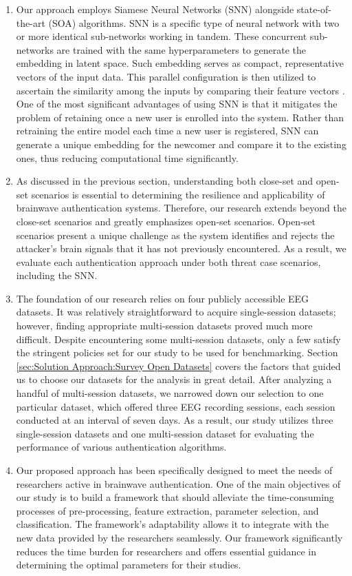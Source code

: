 \begin{enumerate}
\item Our approach employs Siamese Neural Networks (SNN) alongside state-of-the-art (SOA) algorithms. SNN is a specific type of neural network with two or more identical sub-networks working in tandem. These concurrent sub-networks are trained with the same hyperparameters to generate the embedding in latent space. Such embedding serves as compact, representative vectors of the input data. This parallel configuration is then utilized to ascertain the similarity among the inputs by comparing their feature vectors \cite{fallahi2023brainnet}. One of the most significant advantages of using SNN is that it mitigates the problem of retaining once a new user is enrolled into the system. Rather than retraining the entire model each time a new user is registered, SNN can generate a unique embedding for the newcomer and compare it to the existing ones, thus reducing computational time significantly.

\item As discussed in the previous section, understanding both close-set and open-set scenarios is essential to determining the resilience and applicability of brainwave authentication systems. Therefore, our research extends beyond the close-set scenarios and greatly emphasizes open-set scenarios. Open-set scenarios present a unique challenge as the system identifies and rejects the attacker's brain signals that it has not previously encountered. As a result, we evaluate each authentication approach under both threat case scenarios, including the SNN.

\item The foundation of our research relies on four publicly accessible EEG datasets. It was relatively straightforward to acquire single-session datasets; however, finding appropriate multi-session datasets proved much more difficult. Despite encountering some multi-session datasets, only a few satisfy the stringent policies set for our study to be used for benchmarking. Section \ref{sec:Solution Approach:Survey Open Datasets} covers the factors that guided us to choose our datasets for the analysis in great detail. After analyzing a handful of multi-session datasets, we narrowed down our selection to one particular dataset, which offered three EEG recording sessions, each session conducted at an interval of seven days. As a result, our study utilizes three single-session datasets and one multi-session dataset for evaluating the performance of various authentication algorithms.

\item Our proposed approach has been specifically designed to meet the needs of researchers active in brainwave authentication. One of the main objectives of our study is to build a framework that should alleviate the time-consuming processes of pre-processing, feature extraction, parameter selection, and classification. The framework's adaptability allows it to integrate with the new data provided by the researchers seamlessly. Our framework significantly reduces the time burden for researchers and offers essential guidance in determining the optimal parameters for their studies.


\end{enumerate}
